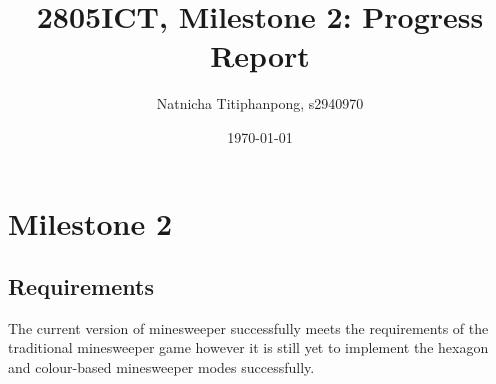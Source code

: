 \documentclass[12pt, a4]{report}
\title{2805ICT, Milestone 2: Progress Report}
\author{Natnicha Titiphanpong, s2940970}%
\date{\today}
\begin{document}
\begin{titlepage}
	\maketitle 
\end{titlepage}
	\tableofcontents
	\pagebreak
	\section{Milestone 2} 
	\subsection{Requirements}
	\par The current  version of minesweeper successfully meets the requirements of the traditional minesweeper game however it is still yet to implement the hexagon and colour-based minesweeper  modes successfully. 
\end{document}
